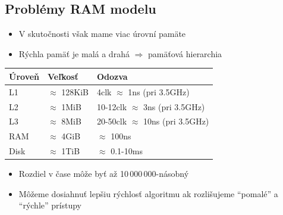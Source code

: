 \documentclass{beamer}
\begin{document}
\subsection{Problémy RAM modelu}
\begin{frame}
    \begin{itemize}
        \item V skutočnosti však mame viac úrovní pamäte
        \item Rýchla pamäť je malá a drahá $\Rightarrow$ pamäťová hierarchia
    \end{itemize}
    \begin{center}
		\begin{tabular}{|l|l|l|}
			\hline
			Úroveň & Veľkosť & Odozva \\ \hline
			L1 & $\approx$ 128KiB & 4clk $\approx$ 1ns (pri 3.5GHz) \\ \hline
			L2 & $\approx$ 1MiB & 10-12clk $\approx$ 3ns (pri 3.5GHz) \\ \hline
			L3 & $\approx$ 8MiB & 20-50clk $\approx$ 10ns (pri 3.5GHz) \\ \hline
			RAM & $\approx$ 4GiB & $\approx$ 100ns \\ \hline
			Disk & $\approx$ 1TiB & $\approx$ 0.1-10ms \\
			\hline
		\end{tabular}
	\end{center}
	\begin{itemize}
	    \item Rozdiel v čase môže byť až 10\,000\,000-násobný
	    \item Môžeme dosiahnuť lepšiu rýchlosť algoritmu ak rozlišujeme ``pomalé'' a ``rýchle'' prístupy
	\end{itemize}
\end{frame}
\end{document}
